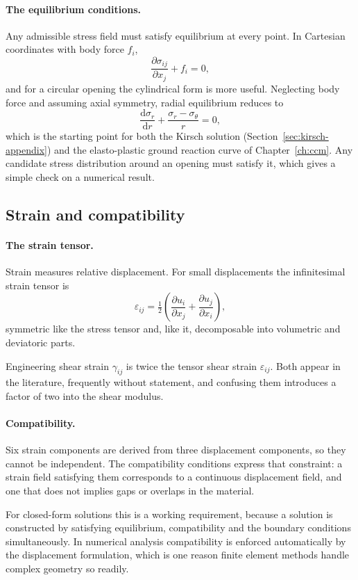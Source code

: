 \paragraph{The equilibrium conditions.}
Any admissible stress field must satisfy equilibrium at every point. In
Cartesian coordinates with body force $f_i$,
\[
\frac{\partial \sigma_{ij}}{\partial x_j} + f_i = 0 ,
\]
and for a circular opening the cylindrical form is more useful. Neglecting
body force and assuming axial symmetry, radial equilibrium reduces to
\[
\frac{\mathrm{d}\sigma_r}{\mathrm{d}r} + \frac{\sigma_r-\sigma_\theta}{r} = 0 ,
\]
which is the starting point for both the Kirsch solution
(Section~\ref{sec:kirsch-appendix}) and the elasto-plastic
ground reaction curve of Chapter~\ref{ch:ccm}. Any candidate stress
distribution around an opening must satisfy it, which gives a simple check
on a numerical result.

\subsection{Strain and compatibility}
\label{sec:strain-and-compatibility}

\paragraph{The strain tensor.}
Strain measures relative displacement. For small displacements the
infinitesimal strain tensor is
\[
\varepsilon_{ij} = \tfrac{1}{2}
\left( \frac{\partial u_i}{\partial x_j} + \frac{\partial u_j}{\partial x_i} \right),
\]
symmetric like the stress tensor and, like it, decomposable into volumetric
and deviatoric parts.

Engineering shear strain $\gamma_{ij}$ is twice
the tensor shear strain $\varepsilon_{ij}$. Both appear in the literature,
frequently without statement, and confusing them introduces a factor of two
into the shear modulus.

\paragraph{Compatibility.}
Six strain components are derived from three displacement components, so they
cannot be independent. The compatibility conditions express that constraint: a
strain field satisfying them corresponds to a continuous displacement field,
and one that does not implies gaps or overlaps in the material.

For closed-form solutions this is a working requirement,
because a solution is constructed by satisfying equilibrium,
compatibility and the boundary conditions simultaneously. In numerical
analysis compatibility is enforced automatically by the displacement
formulation, which is one reason finite element methods handle complex
geometry so readily.

